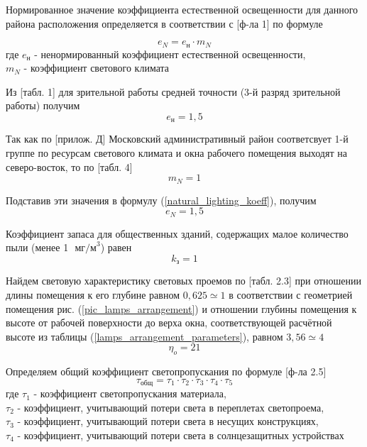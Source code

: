 Нормированное значение коэффициента естественной освещенности для данного
района расположения определяется в соответствии с \cite{ecology_snip_23_05_95}[ф-ла 1]
по формуле

\begin{equation}
    e_N = e_\text{н} \cdot m_N
    \label{natural_lighting_koeff}
\end{equation}
где $e_\text{н}$ - ненормированный коэффициент естественной освещенности, \\
$m_N$ - коэффициент светового климата

Из \cite{ecology_snip_23_05_95}[табл. 1] для зрительной работы средней точности
(3-й разряд зрительной работы) получим
$$
    e_\text{н} = 1,5
$$

Так как по \cite{ecology_snip_23_05_95}[прилож. Д] Московский административный
район соответсвует 1-й группе по ресурсам светового климата и окна рабочего
помещения выходят на северо-восток, то по \cite{ecology_snip_23_05_95}[табл. 4]
$$
    m_N = 1
$$

Подставив эти значения в формулу (\ref{natural_lighting_koeff}), получим
$$
    e_N = 1,5
$$

Коэффициент запаса для общественных зданий, содержащих малое количество пыли
(менее 1 $\text{ мг/м}^3$) равен
$$
    k_\text{з} = 1
$$

Найдем световую характеристику световых проемов по
\cite{lighting_calc_method}[табл. 2.3] при отношении длины помещения к его глубине
равном $0,625 \simeq 1$ в соответствии с геометрией помещения рис. (\ref{pic_lamps_arrangement})
и отношении глубины помещения к высоте от рабочей поверхности до верха окна,
соответствующей расчётной высоте из таблицы (\ref{lamps_arrangement_parameters}),
равном $3,56 \simeq 4$
$$
    \eta_o = 21
$$

Определяем общий коэффициент светопропускания по формуле
\cite{lighting_calc_method}[ф-ла 2.5]
\begin{equation}
    \tau_\text{общ} = \tau_1 \cdot \tau_2 \cdot \tau_3 \cdot \tau_4 \cdot \tau_5
    \label{overall_light_pass_koeff}
\end{equation}
где $\tau_1$ - коэффициент светопропускания материала,                          \\
$\tau_2$ - коэффициент, учитывающий потери света в переплетах светопроема,      \\
$\tau_3$ - коэффициент, учитывающий потери света в несущих конструкциях,        \\
$\tau_4$ - коэффициент, учитывающий потери света в солнцезащитных устройствах

